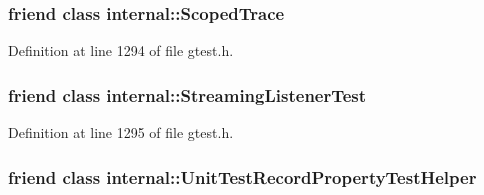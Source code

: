 \subsubsection[{\texorpdfstring{internal\+::\+Scoped\+Trace}{internal::ScopedTrace}}]{\setlength{\rightskip}{0pt plus 5cm}friend class {\bf internal\+::\+Scoped\+Trace}\hspace{0.3cm}{\ttfamily [friend]}}\hypertarget{classtesting_1_1_unit_test_afa3927576c08d7b1e197ba16b2b3dcb7}{}\label{classtesting_1_1_unit_test_afa3927576c08d7b1e197ba16b2b3dcb7}


Definition at line 1294 of file gtest.\+h.

\subsubsection[{\texorpdfstring{internal\+::\+Streaming\+Listener\+Test}{internal::StreamingListenerTest}}]{\setlength{\rightskip}{0pt plus 5cm}friend class internal\+::\+Streaming\+Listener\+Test\hspace{0.3cm}{\ttfamily [friend]}}\hypertarget{classtesting_1_1_unit_test_adc037d188dab349a94868991955c9cd4}{}\label{classtesting_1_1_unit_test_adc037d188dab349a94868991955c9cd4}


Definition at line 1295 of file gtest.\+h.

\subsubsection[{\texorpdfstring{internal\+::\+Unit\+Test\+Record\+Property\+Test\+Helper}{internal::UnitTestRecordPropertyTestHelper}}]{\setlength{\rightskip}{0pt plus 5cm}friend class {\bf internal\+::\+Unit\+Test\+Record\+Property\+Test\+Helper}\hspace{0.3cm}{\ttfamily [friend]}}\hypertarget{classtesting_1_1_unit_test_ae970f89a9f477a349fe5778be85ef42e}{}\label{classtesting_1_1_unit_test_ae970f89a9f477a349fe5778be85ef42e}


